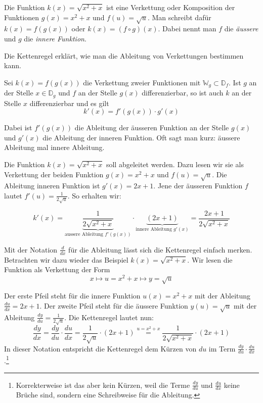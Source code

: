 Die Funktion $k(x)=\sqrt{x^2+x}$ ist eine Verkettung oder Komposition der Funktionen $g(x)=x^2+x$ und $f(u)=\sqrt{u}$. Man schreibt dafür $k(x)=f(g(x))$ oder $k(x)=(f\circ g)(x)$. Dabei nennt man $f$ die \emph{äussere} und $g$ die \emph{innere Funktion}.

Die Kettenregel erklärt, wie man die Ableitung von Verkettungen bestimmen kann.

\begin{theo}
    {}
    Sei $k(x)=f(g(x))$ die Verkettung zweier Funktionen mit $\mathbb{W}_g\subset \mathbb{D}_f$. Ist $g$ an der Stelle $x\in \mathbb{D}_g$ und $f$ an der Stelle $g(x)$ differenzierbar, so ist auch $k$ an der Stelle $x$ differenzierbar und es gilt
    $$k'(x)=f'(g(x))\cdot g'(x)$$

\end{theo}
Dabei ist $f'(g(x))$ die Ableitung der äusseren Funktion an der Stelle $g(x)$ und $g'(x)$ die Ableitung der inneren Funktion. Oft sagt man kurz: \glqq äussere Ableitung mal innere Ableitung\grqq{}.

\begin{example}
    Die Funktion $k(x)=\sqrt{x^2+x}$ soll abgeleitet werden. Dazu lesen wir sie als Verkettung der  beiden Funktion $g(x)=x^2+x$ und $f(u)=\sqrt{u}$. Die Ableitung inneren Funktion ist $g'(x) = 2x+1$. Jene der äusseren Funktion $f$ lautet $f'(u)=\frac{1}{2\sqrt{u}}$. So erhalten wir:

    $$k'(x) = \underbrace{\frac{1}{2\sqrt{x^2+x}}}_{\text{aussere Ableitung }f'(g(x))} \cdot \underbrace{(2x+1)}_{\text{innere Ableitung }g'(x)} = \frac{2x+1}{2\sqrt{x^2+x}}$$


\end{example}

Mit der Notation $\frac{d}{dx}$ für die Ableitung lässt sich die Kettenregel einfach merken. Betrachten wir dazu wieder das Beispiel $k(x)=\sqrt{x^2+x}$.
Wir lesen die Funktion als Verkettung der Form
$$x\mapsto u = x^2+x \mapsto y= \sqrt{u}$$

Der erste Pfeil steht für die innere Funktion $u(x)=x^2+x$ mit der Ableitung $\frac{du}{dx}=2x+1$. Der zweite Pfeil steht für die äussere Funktion $y(u)=\sqrt{u}$ mit der Ableitung $\frac{dy}{du}=\frac{1}{2\sqrt{u}}$. Die Kettenregel lautet nun:
$$\frac{dy}{dx}= \frac{dy}{du}\cdot \frac{du}{dx} = \frac{1}{2\sqrt{u}} \cdot (2x+1) \stackrel{u=x^2+x}{=} \frac{1}{2\sqrt{x^2+x}}\cdot (2x+1)$$
In dieser Notation entspricht die Kettenregel dem \glqq Kürzen\grqq{} von $du$ im Term $\frac{dy}{du}\cdot \frac{du}{dx}$.\footnote{Korrekterweise ist das aber kein Kürzen, weil die Terme $\frac{dy}{du}$ und $\frac{du}{dx}$ keine Brüche sind, sondern eine Schreibweise für die Ableitung.}


